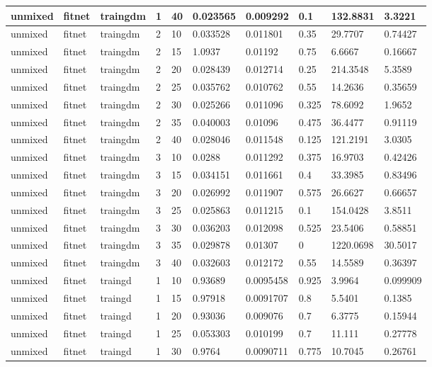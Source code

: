 \begin{longtable}{lllllllll}
unmixed & fitnet & traingdm & 1 & 40 & 0.023565 & 0.009292 & 0.1 & 132.8831 & 3.3221 \\ \hline 
unmixed & fitnet & traingdm & 2 & 10 & 0.033528 & 0.011801 & 0.35 & 29.7707 & 0.74427 \\ \hline 
unmixed & fitnet & traingdm & 2 & 15 & 1.0937 & 0.01192 & 0.75 & 6.6667 & 0.16667 \\ \hline 
unmixed & fitnet & traingdm & 2 & 20 & 0.028439 & 0.012714 & 0.25 & 214.3548 & 5.3589 \\ \hline 
unmixed & fitnet & traingdm & 2 & 25 & 0.035762 & 0.010762 & 0.55 & 14.2636 & 0.35659 \\ \hline 
unmixed & fitnet & traingdm & 2 & 30 & 0.025266 & 0.011096 & 0.325 & 78.6092 & 1.9652 \\ \hline 
unmixed & fitnet & traingdm & 2 & 35 & 0.040003 & 0.01096 & 0.475 & 36.4477 & 0.91119 \\ \hline 
unmixed & fitnet & traingdm & 2 & 40 & 0.028046 & 0.011548 & 0.125 & 121.2191 & 3.0305 \\ \hline 
unmixed & fitnet & traingdm & 3 & 10 & 0.0288 & 0.011292 & 0.375 & 16.9703 & 0.42426 \\ \hline 
unmixed & fitnet & traingdm & 3 & 15 & 0.034151 & 0.011661 & 0.4 & 33.3985 & 0.83496 \\ \hline 
unmixed & fitnet & traingdm & 3 & 20 & 0.026992 & 0.011907 & 0.575 & 26.6627 & 0.66657 \\ \hline 
unmixed & fitnet & traingdm & 3 & 25 & 0.025863 & 0.011215 & 0.1 & 154.0428 & 3.8511 \\ \hline 
unmixed & fitnet & traingdm & 3 & 30 & 0.036203 & 0.012098 & 0.525 & 23.5406 & 0.58851 \\ \hline 
unmixed & fitnet & traingdm & 3 & 35 & 0.029878 & 0.01307 & 0 & 1220.0698 & 30.5017 \\ \hline 
unmixed & fitnet & traingdm & 3 & 40 & 0.032603 & 0.012172 & 0.55 & 14.5589 & 0.36397 \\ \hline 
unmixed & fitnet & traingd & 1 & 10 & 0.93689 & 0.0095458 & 0.925 & 3.9964 & 0.099909 \\ \hline 
unmixed & fitnet & traingd & 1 & 15 & 0.97918 & 0.0091707 & 0.8 & 5.5401 & 0.1385 \\ \hline 
unmixed & fitnet & traingd & 1 & 20 & 0.93036 & 0.009076 & 0.7 & 6.3775 & 0.15944 \\ \hline 
unmixed & fitnet & traingd & 1 & 25 & 0.053303 & 0.010199 & 0.7 & 11.111 & 0.27778 \\ \hline 
unmixed & fitnet & traingd & 1 & 30 & 0.9764 & 0.0090711 & 0.775 & 10.7045 & 0.26761 \\ \hline 

\end{longtable}
